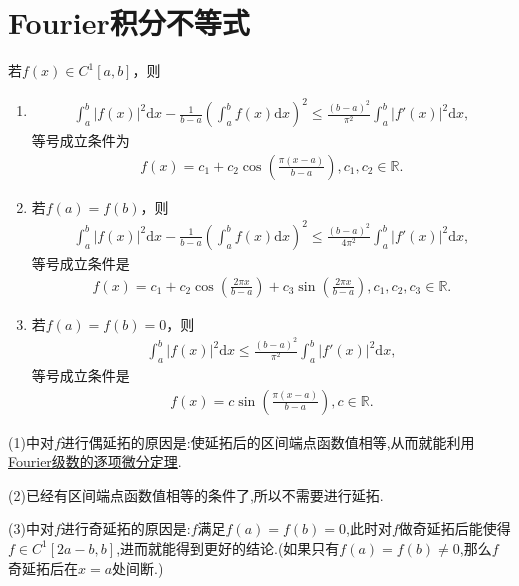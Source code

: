 \documentclass[../../main.tex]{subfiles}%
\begin{document}
\section{Fourier积分不等式}

\begin{theorem}[Fourier型积分不等式]\label{theorem:Fourier型积分不等式}
若$f(x)\in C^1[a,b]$，则
\begin{enumerate}[(1)]
\item \begin{align*}
\int_{a}^{b} |f(x)|^2 \mathrm{d}x - \frac{1}{b - a} \left( \int_{a}^{b} f(x) \mathrm{d}x \right)^2 \leqslant  \frac{(b - a)^2}{\pi^2} \int_{a}^{b} |f'(x)|^2 \mathrm{d}x,
\end{align*}
等号成立条件为
\begin{align*}
f(x) = c_1 + c_2 \cos\left( \frac{\pi(x - a)}{b - a} \right), c_1, c_2 \in \mathbb{R}.
\end{align*}

\item 若$f(a) = f(b)$，则
\begin{align*}
\int_{a}^{b} |f(x)|^2 \mathrm{d}x - \frac{1}{b - a} \left( \int_{a}^{b} f(x) \mathrm{d}x \right)^2 \leqslant  \frac{(b - a)^2}{4\pi^2} \int_{a}^{b} |f'(x)|^2 \mathrm{d}x,
\end{align*}
等号成立条件是
\begin{align*}
f(x) = c_1 + c_2 \cos\left( \frac{2\pi x}{b - a} \right) + c_3 \sin\left( \frac{2\pi x}{b - a} \right), c_1, c_2, c_3 \in \mathbb{R}.
\end{align*}

\item 若$f(a) = f(b) = 0$，则
\begin{align*}
\int_{a}^{b} |f(x)|^2 \mathrm{d}x \leqslant  \frac{(b - a)^2}{\pi^2} \int_{a}^{b} |f'(x)|^2 \mathrm{d}x,
\end{align*}
等号成立条件是
\begin{align*}
f(x) = c \sin\left( \frac{\pi (x - a)}{b - a} \right), c \in \mathbb{R}.
\end{align*} 
\end{enumerate}
\end{theorem}
\begin{remark}
(1)中对$f$进行偶延拓的原因是:使延拓后的区间端点函数值相等,从而就能利用\hyperref[theorem:Fourier级数的逐项微分定理]{Fourier级数的逐项微分定理}.

(2)已经有区间端点函数值相等的条件了,所以不需要进行延拓.

(3)中对$f$进行奇延拓的原因是:$f$满足$f(a)=f(b)=0$,此时对$f$做奇延拓后能使得$f\in C^1[2a-b,b]$,进而就能得到更好的结论.(如果只有$f(a)=f(b)\ne0$,那么$f$奇延拓后在$x=a$处间断.)
\end{remark}
\end{document}

